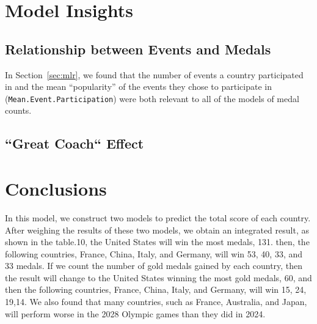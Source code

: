 \documentclass{mcmthesis}
\begin{document}
\section{Model Insights}

\subsection{Relationship between Events and Medals}

In Section~\ref{sec:mlr}, we found that the number of events a country participated in and the mean \enquote{popularity} of the events they chose to participate in (\texttt{Mean.Event.Participation}) were both relevant to all of the models of medal counts.

\subsection{``Great Coach`` Effect}

\section{Conclusions}
In this model, we construct two models to predict the total score of each country. After weighing the results of these two models, we obtain an integrated result, as shown in the table.10, the United States will win the most medals, 131. then, the following countries, France, China, Italy, and Germany, will win 53, 40, 33, and 33 medals. If we count the number of gold medals gained by each country, then the result will change to the United States winning the most gold medals, 60, and then the following countries, France, China, Italy, and Germany, will win 15, 24, 19,14. We also found that many countries, such as France, Australia, and Japan, will perform worse in the 2028 Olympic games than they did in 2024.
\end{document}
